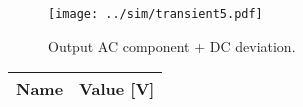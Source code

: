 \begin{figure}[H] \centering
\texttt{[image: ../sim/transient5.pdf]}
\caption{Output AC component + DC deviation.}
\label{fig:transient5}
\end{figure}

\begin{table}[H]
  \centering
  \begin{tabular}{|l|r|}
    \hline    
    {\bf Name} & {\bf Value [V]} \\ \hline
    
  \end{tabular}
  \label{tab:meanv012}
\end{table}